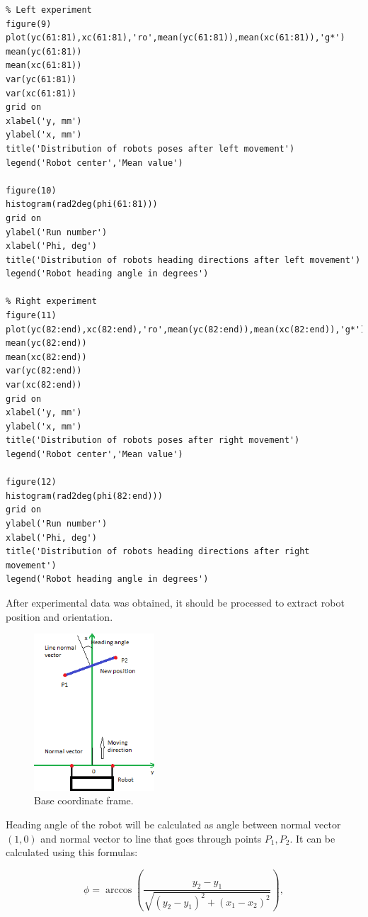 \documentclass[a4paper, 12pt]{article}
\begin{document}
\begin{lstlisting}
% Left experiment
figure(9)
plot(yc(61:81),xc(61:81),'ro',mean(yc(61:81)),mean(xc(61:81)),'g*')
mean(yc(61:81))
mean(xc(61:81))
var(yc(61:81))
var(xc(61:81))
grid on
xlabel('y, mm')
ylabel('x, mm')
title('Distribution of robots poses after left movement')
legend('Robot center','Mean value')

figure(10)
histogram(rad2deg(phi(61:81)))
grid on
ylabel('Run number')
xlabel('Phi, deg')
title('Distribution of robots heading directions after left movement')
legend('Robot heading angle in degrees')

% Right experiment
figure(11)
plot(yc(82:end),xc(82:end),'ro',mean(yc(82:end)),mean(xc(82:end)),'g*')
mean(yc(82:end))
mean(xc(82:end))
var(yc(82:end))
var(xc(82:end))
grid on
xlabel('y, mm')
ylabel('x, mm')
title('Distribution of robots poses after right movement')
legend('Robot center','Mean value')

figure(12)
histogram(rad2deg(phi(82:end)))
grid on
ylabel('Run number')
xlabel('Phi, deg')
title('Distribution of robots heading directions after right movement')
legend('Robot heading angle in degrees')
\end{lstlisting}

After experimental data was obtained, it should be processed to extract robot position and orientation. 

\begin{figure}[h]
  \centering
  \caption{Base coordinate frame.\label{fig:frame}}
  \includegraphics[width=0.4\textwidth]{frame}
\end{figure}

Heading angle of the robot will be calculated as angle between normal vector $(1,0)$ and normal vector to line that goes through points $P_1,P_2.$ It can be calculated using this formulas:

\begin{equation}
\phi = \arccos(\frac{y_2-y_1}{\sqrt{(y_2-y_1)^2+(x_1-x_2)^2}}),
\end{equation}
\end{document}
